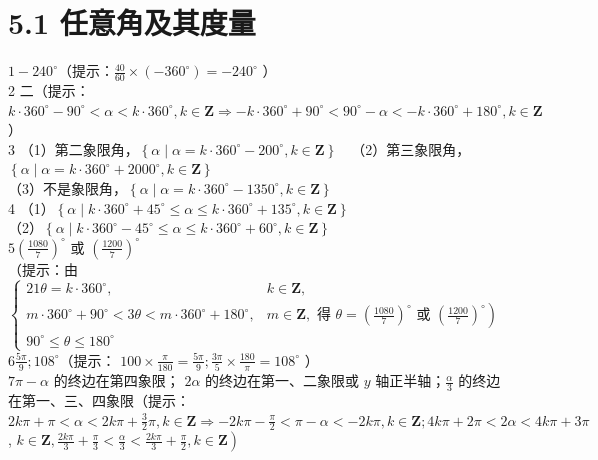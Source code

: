 \documentclass[10pt]{article}
\begin{document}
\section*{5.1 任意角及其度量}
\(1-240^{\circ}\)（提示：\(\frac{40}{60} \times\left(-360^{\circ}\right)=-240^{\circ}\) ）\\
2 二（提示：\(k \cdot 360^{\circ}-90^{\circ}<\alpha<k \cdot 360^{\circ}, k \in \mathbf{Z} \Rightarrow-k \cdot 360^{\circ}+90^{\circ}<90^{\circ}-\alpha<-k \cdot 360^{\circ}+180^{\circ}, k \in \mathbf{Z}\) ）\\
3 （1）第二象限角，\(\left\{\alpha \mid \alpha=k \cdot 360^{\circ}-200^{\circ}, k \in \mathbf{Z}\right\} \quad\)（2）第三象限角，\(\left\{\alpha \mid \alpha=k \cdot 360^{\circ}+2000^{\circ}, k \in \mathbf{Z}\right\}\)\\
（3）不是象限角，\(\left\{\alpha \mid \alpha=k \cdot 360^{\circ}-1350^{\circ}, k \in \mathbf{Z}\right\}\)\\
4 （1）\(\left\{\alpha \mid k \cdot 360^{\circ}+45^{\circ} \leqslant \alpha \leqslant k \cdot 360^{\circ}+135^{\circ}, k \in \mathbf{Z}\right\}\)\\
（2）\(\left\{\alpha \mid k \cdot 360^{\circ}-45^{\circ} \leqslant \alpha \leqslant k \cdot 360^{\circ}+60^{\circ}, k \in \mathbf{Z}\right\}\)\\
\(5\left(\frac{1080}{7}\right)^{\circ}\) 或 \(\left(\frac{1200}{7}\right)^{\circ}\)\\
（提示：由 \(\begin{cases}21 \theta=k \cdot 360^{\circ}, & k \in \mathbf{Z}, \\ m \cdot 360^{\circ}+90^{\circ}<3 \theta<m \cdot 360^{\circ}+180^{\circ}, & \left.m \in \mathbf{Z}, \text { 得 } \theta=\left(\frac{1080}{7}\right)^{\circ} \text { 或 }\left(\frac{1200}{7}\right)^{\circ}\right) \\ 90^{\circ} \leqslant \theta \leqslant 180^{\circ} & \end{cases}\)\\
\(6 \frac{5 \pi}{9} ; 108^{\circ}\)（提示： \(100 \times \frac{\pi}{180}=\frac{5 \pi}{9} ; \frac{3 \pi}{5} \times \frac{180}{\pi}=108^{\circ}\) ）\\
\(7 \pi-\alpha\) 的终边在第四象限； \(2 \alpha\) 的终边在第一、二象限或 \(y\) 轴正半轴；\(\frac{\alpha}{3}\) 的终边在第一、三、四象限（提示：\\
\(2 k \pi+\pi<\alpha<2 k \pi+\frac{3}{2} \pi, k \in \mathbf{Z} \Rightarrow-2 k \pi-\frac{\pi}{2}<\pi-\alpha<-2 k \pi, k \in \mathbf{Z} ; 4 k \pi+2 \pi<2 \alpha<4 k \pi+3 \pi\), \(\left.k \in \mathbf{Z}, \frac{2 k \pi}{3}+\frac{\pi}{3}<\frac{\alpha}{3}<\frac{2 k \pi}{3}+\frac{\pi}{2}, k \in \mathbf{Z}\right)\)\\
\end{document}
